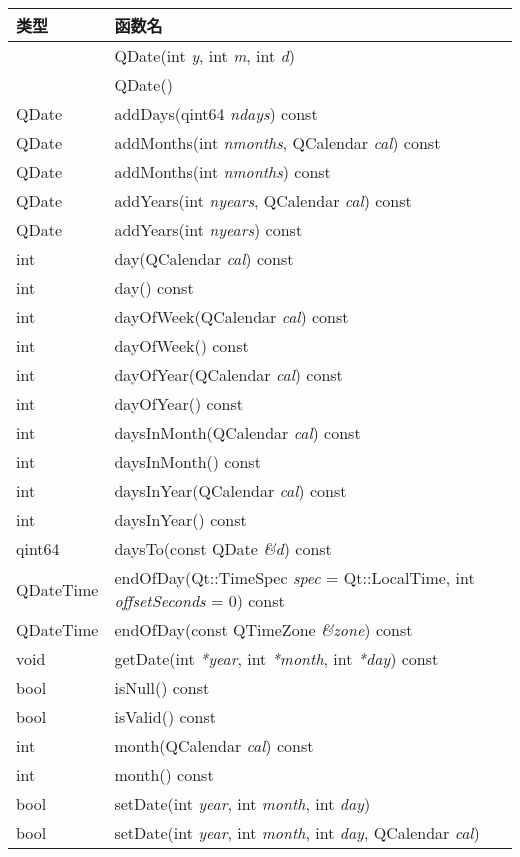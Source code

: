 \begin{longtable}[l]{|l|m{30em}|}
\hline
类型	&函数名\\
\hline
&QDate(int \emph{y}, int \emph{m}, int \emph{d})\\
\hline
&QDate()\\
\hline
QDate&	addDays(qint64 \emph{ndays}) const\\
\hline
QDate&	addMonths(int \emph{nmonths}, QCalendar \emph{cal}) const\\
\hline
QDate&	addMonths(int \emph{nmonths}) const\\
\hline
QDate&	addYears(int \emph{nyears}, QCalendar \emph{cal}) const\\
\hline
QDate&	addYears(int \emph{nyears}) const\\
\hline
int&	day(QCalendar \emph{cal}) const\\
\hline
int&	day() const\\
\hline
int&	dayOfWeek(QCalendar \emph{cal}) const\\
\hline
int&	dayOfWeek() const\\
\hline
int&	dayOfYear(QCalendar \emph{cal}) const\\
\hline
int&	dayOfYear() const\\
\hline
int&	daysInMonth(QCalendar \emph{cal}) const\\
\hline
int&	daysInMonth() const\\
\hline
int&	daysInYear(QCalendar \emph{cal}) const\\
\hline
int&	daysInYear() const\\
\hline
qint64&	daysTo(const QDate \emph{\&d}) const\\
\hline
QDateTime&	endOfDay(Qt::TimeSpec \emph{spec} = Qt::LocalTime, int \emph{offsetSeconds} = 0) const\\
\hline
QDateTime&	endOfDay(const QTimeZone \emph{\&zone}) const\\
\hline
void&	getDate(int \emph{*year}, int \emph{*month}, int \emph{*day}) const\\
\hline
bool&	isNull() const\\
\hline
bool&	isValid() const\\
\hline
int&	month(QCalendar \emph{cal}) const\\
\hline
int&	month() const\\
\hline
bool&	setDate(int \emph{year}, int \emph{month}, int \emph{day})\\
\hline
bool&	setDate(int \emph{year}, int \emph{month}, int \emph{day}, QCalendar \emph{cal})\\

\end{longtable}
